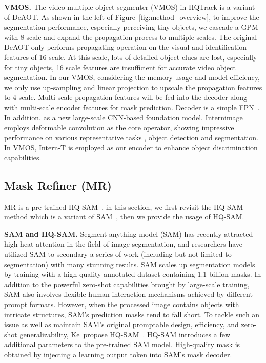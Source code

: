 \documentclass[10pt,twocolumn,letterpaper]{article}
\begin{document}
\noindent\textbf{VMOS.}
The video multiple object segmenter (VMOS) in HQTrack is a variant of DeAOT.
As shown in the left of Figure~\ref{fig:method_overview}, to improve the segmentation performance, especially perceiving tiny objects,
we cascade a GPM with 8 scale and expand the propagation process to multiple scales.
The original DeAOT only performs propagating operation on the visual and identification features of 16 scale. 
At this scale, lots of detailed object clues are lost, especially for tiny objects, 16 scale features are insufficient for accurate video object segmentation.
In our VMOS, considering the memory usage and model efficiency, we only use up-sampling and linear projection to upscale the propagation features to 4 scale.
Multi-scale propagation features will be fed into the decoder along with multi-scale encoder features for mask prediction.
Decoder is a simple FPN~\cite{fpn}.
In addition, as a new large-scale CNN-based foundation model, Internimage~\cite{internimage} 
employs deformable convolution as the core operator, showing impressive performance on various representative tasks \eg, object detection and segmentation.
In VMOS, Intern-T is employed as our encoder to enhance object discrimination capabilities. 

\subsection{Mask Refiner (MR)}
\label{sec:mr}

MR is a pre-trained HQ-SAM~\cite{sam_hq}, in this section, we first revisit the HQ-SAM method which is a variant of SAM~\cite{sam}, then we provide the usage of HQ-SAM.

\noindent\textbf{SAM and HQ-SAM.}
Segment anything model (SAM) has recently attracted high-heat attention in the field of image segmentation, and researchers have utilized SAM to secondary a series of work (including but not limited to segmentation) with many stunning results.
SAM scales up segmentation models by training with a high-quality annotated dataset containing 1.1 billion masks.
In addition to the powerful zero-shot capabilities brought  by large-scale training, SAM also involves flexible human interaction mechanisms achieved by different prompt formats.  
However, when the processed image contains  objects with intricate structures, SAM's prediction masks tend to fall short.
To tackle such an issue as well as maintain  SAM's original promptable design, efficiency, and zero-shot generalizability, Ke~\etal propose HQ-SAM~\cite{sam_hq}.  HQ-SAM introduces a few additional parameters to the pre-trained SAM model. High-quality mask is obtained by injecting a learning output token into SAM's mask decoder.
\end{document}
